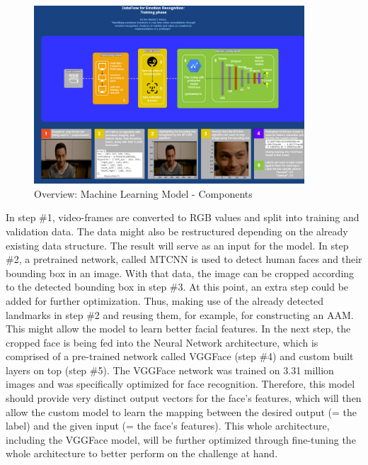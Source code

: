 \documentclass[11pt,a4paper]{scrbook}
\begin{document}
\begin{figure}[H]
  \begin{center}
  \includegraphics[angle=90, width=0.9\textwidth]{Figures/DataFlow_Diagram_Expose.png}
  \caption{Overview: Machine Learning Model - Components}
  \label{fig:MachineLearningModelComponents}
  \end{center}
\end{figure}

In step \#1, video-frames are converted to RGB values and split into training and validation data. The data might also be restructured depending on the already existing data structure. The result will serve as an input for the model.
\newline\newline
In step \#2, a pretrained network, called \gls{MTCNN} \citep{Zhang:2016:MTCCN} is used to detect human faces and their bounding box in an image. With that data, the image can be cropped according to the detected bounding box in step \#3. At this point, an extra step could be added for further optimization. Thus, making use of the already detected landmarks in step \#2 and reusing them, for example, for constructing an \gls{AAM}. This might allow the model to learn better facial features.
\newline\newline
In the next step, the cropped face is being fed into the Neural Network architecture, which is comprised of a pre-trained network called VGGFace \citep{Cao:2018:VGGFace2} (step \#4) and custom built layers on top (step \#5). The VGGFace network was trained on 3.31 million images and was specifically optimized for face recognition. Therefore, this model should provide very distinct output vectors for the face's features, which will then allow the custom model to learn the mapping between the desired output (= the label) and the given input (= the face's features). This whole architecture, including the VGGFace model, will be further optimized through fine-tuning the whole architecture to better perform on the challenge at hand.
\end{document}
